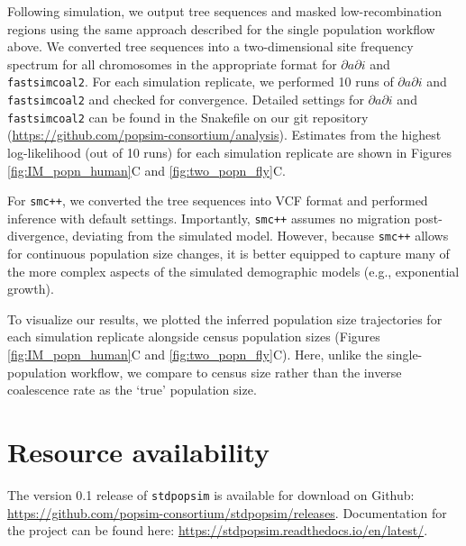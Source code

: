 \documentclass[12pt,halfline,a4paper]{ouparticle}
\newcommand{\stdpopsim}{\texttt{stdpopsim}\xspace}
\newcommand{\dadi}{$\partial a \partial i$\xspace}
\newcommand{\smcpp}{\texttt{smc++}\xspace}
\newcommand{\fastsimcoal}{\texttt{fastsimcoal2}\xspace}
\begin{document}
Following simulation, we output tree sequences and masked low-recombination
regions using the same approach described for the single population workflow above. We
converted tree sequences into a two-dimensional site frequency spectrum for all
chromosomes in the appropriate format for \dadi and \fastsimcoal. For each simulation
replicate, we performed 10 runs of \dadi and \fastsimcoal and checked for convergence.
Detailed settings for \dadi and \fastsimcoal can be found in the Snakefile
on our git repository (\url{https://github.com/popsim-consortium/analysis}).
Estimates from the highest log-likelihood (out of 10 runs) for each simulation replicate
are shown in Figures \ref{fig:IM_popn_human}C and \ref{fig:two_popn_fly}C.

For \smcpp, we converted the tree sequences into VCF format and performed inference
with default settings. Importantly, \smcpp assumes no migration post-divergence,
deviating from the simulated model.  However, because \smcpp allows
for continuous population size changes, it is better equipped to capture many of the
more complex aspects of the simulated demographic models (e.g., exponential growth).

To visualize our results, we plotted the inferred population size trajectories
for each simulation replicate alongside census population sizes
(Figures \ref{fig:IM_popn_human}C and \ref{fig:two_popn_fly}C).
Here, unlike the single-population workflow,
we compare to census size rather than the inverse coalescence rate as the `true' population size.

\section*{Resource availability}
The version 0.1 release of \stdpopsim is available for download on Github: 
\url{https://github.com/popsim-consortium/stdpopsim/releases}. 
Documentation for the project can be found here: 
\url{https://stdpopsim.readthedocs.io/en/latest/}. 
\end{document}
